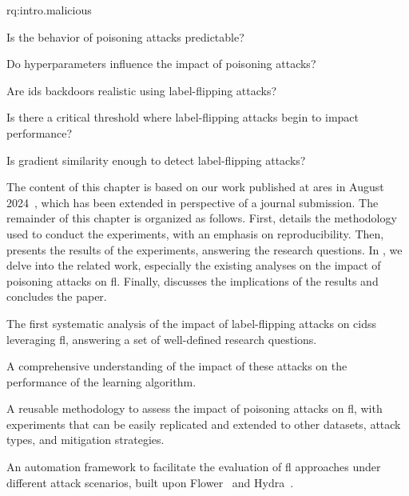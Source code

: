 \begin{subquestions}{rq:intro.malicious}
  \item Is the behavior of poisoning attacks predictable?\label{rq:assess.predictability}
  \item Do hyperparameters influence the impact of poisoning attacks?\label{rq:assess.hyperparams}
  \item Are \gls{ids} backdoors realistic using label-flipping attacks?\label{rq:assess.backdoors}
  \item Is there a critical threshold where label-flipping attacks begin to impact performance?\label{rq:assess.threshold}
  \item Is gradient similarity enough to detect label-flipping attacks?\label{rq:assess.similarity}
\end{subquestions}

The content of this chapter is based on our work published at \gls{ares} in August 2024~\cite{lavaur_ares_bass_2024}, which has been extended in perspective of a journal submission.
The remainder of this chapter is organized as follows.
First,  details the methodology used to conduct the experiments, with an emphasis on reproducibility.
Then,  presents the results of the experiments, answering the research questions.
In , we delve into the related work, especially the existing analyses on the impact of poisoning attacks on \gls{fl}.
Finally,  discusses the implications of the results and concludes the paper.


\begin{contribs}
  \item The first systematic analysis of the impact of label-flipping attacks on \glspl{cids} leveraging \gls{fl}, answering a set of well-defined research questions.
  \item A comprehensive understanding of the impact of these attacks on the performance of the learning algorithm.
  \item A reusable methodology to assess the impact of poisoning attacks on \gls{fl}, with experiments that can be easily replicated and extended to other datasets, attack types, and mitigation strategies.
  \item An automation framework to facilitate the evaluation of \gls{fl} approaches under different attack scenarios, built upon Flower~\cite{beutel_Flowerfriendlyfederated_2020} and Hydra~\cite{Hydra}.
\end{contribs}